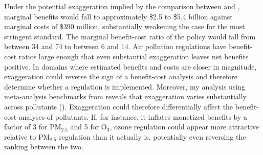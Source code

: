 \documentclass[12pt]{article}
\begin{document}
		Under the potential exaggeration implied by the comparison between \cite{schwartz_estimating_2015} and \cite{zanobetti_effect_2009}, marginal benefits would fall to approximately \$2.5 to \$5.4 billion against marginal costs of \$390 million, substantially weakening the case for the most stringent standard. The marginal benefit-cost ratio of the policy would fall from between 34 and 74 to between 6 and 14. Air pollution regulations have benefit-cost ratios large enough that even substantial exaggeration leaves net benefits positive. In domains where estimated benefits and costs are closer in magnitude, exaggeration could reverse the sign of a benefit-cost analysis and therefore determine whether a regulation is implemented. Moreover, my analysis using meta-analysis benchmarks from \cite{shah_short_2015} reveals that exaggeration varies substantially across pollutants (). Exaggeration could therefore differentially affect the benefit-cost analyses of pollutants. If, for instance, it inflates monetized benefits by a factor of 3 for PM$_{2.5}$ and 5 for O$_{3}$, ozone regulation could appear more attractive relative to PM$_{2.5}$ regulation than it actually is, potentially even reversing the ranking between the two.
		
\end{document}
